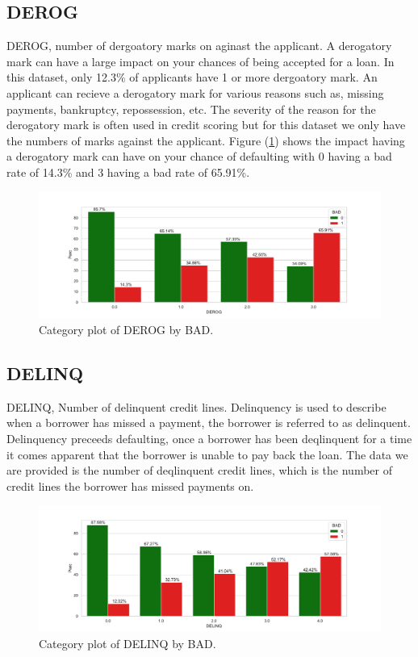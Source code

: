 \subsection*{DEROG}

DEROG,  number of dergoatory marks on aginast the applicant. A derogatory mark can have a large impact on your chances of being accepted for a loan. In this dataset,  only 12.3\% of applicants have 1 or more dergoatory mark. An applicant can recieve a derogatory mark for various reasons such as,  missing payments,  bankruptcy,  repossession,  etc. The severity of the reason for the derogatory mark is often used in credit scoring but for this dataset we only have the numbers of marks against the applicant. Figure (\ref{derog_cat}) shows the impact having a derogatory mark can have on your chance of defaulting with 0 having a bad rate of 14.3\% and 3 having a bad rate of 65.91\%.

\begin{figure}[!ht]
	\centering
	\includegraphics[scale=0.40]{figs/derog_cat.pdf}
	\caption{Category plot of DEROG by BAD. \label{derog_cat}}
\end{figure}

\subsection*{DELINQ}

DELINQ,  Number of delinquent credit lines. Delinquency is used to describe when a borrower has missed a payment,  the borrower is referred to as delinquent. Delinquency preceeds defaulting,  once a borrower has been deqlinquent for a time it comes apparent that the borrower is unable to pay back the loan. The data we are provided is the number of deqlinquent credit lines,  which is the number of credit lines the borrower has missed payments on. 

\begin{figure}[!ht]
	\centering
	\includegraphics[scale=0.40]{figs/delinq_cat.pdf}
	\caption{Category plot of DELINQ by BAD. \label{delinq_cat}}
\end{figure}

